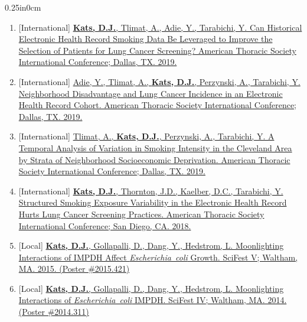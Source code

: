 \documentclass[11pt]{article}
\newcommand{\blockindent}{0.25in}
\begin{document}
\begin{adjustwidth}{\blockindent}{0cm}
\begin{enumerate}[resume]
		\item\label{ats19poster}[International] \href{https://www.dankats.com/research/ATS2019Poster.pdf}{\textbf{Kats, D.J.}, Tlimat, A., Adie, Y., Tarabichi, Y. Can Historical Electronic Health Record Smoking Data Be Leveraged to Improve the Selection of Patients for Lung Cancer Screening? American Thoracic Society International Conference; Dallas, TX. 2019.}

		\item\label{ats19adie}[International] \href{https://doi.org/10.1164/ajrccm-conference.2019.199.1_MeetingAbstracts.A7287}{Adie, Y., Tlimat, A., \textbf{Kats, D.J.}, Perzynski, A., Tarabichi, Y. Neighborhood Disadvantage and Lung Cancer Incidence in an Electronic Health Record Cohort. American Thoracic Society International Conference; Dallas, TX. 2019.}

		\item\label{ats19tlimat}[International] \href{https://doi.org/10.1164/ajrccm-conference.2019.199.1_MeetingAbstracts.A6712}{Tlimat, A., \textbf{Kats, D.J.}, Perzynski, A., Tarabichi, Y. A Temporal Analysis of Variation in Smoking Intensity in the Cleveland Area by Strata of Neighborhood Socioeconomic Deprivation. American Thoracic Society International Conference; Dallas, TX. 2019.}

		\item\label{ats18}[International] \href{http://www.dankats.com/research/ATS2018.pdf}{\textbf{Kats, D.J.}, Thornton, J.D., Kaelber, D.C., Tarabichi, Y. Structured Smoking Exposure Variability in the Electronic Health Record Hurts Lung Cancer Screening Practices. American Thoracic Society International Conference; San Diego, CA. 2018.}

		\item\label{scifest15}[Local] \href{https://kb.brandeis.edu/display/SCI/SciFest+V+Abstracts?preview=/16613394/16613408/scifest-2015-abstracts.pdf}{\textbf{Kats, D.J.}, Gollapalli, D., Dang, Y., Hedstrom, L. Moonlighting Interactions of IMPDH Affect \textit{Escherichia~coli} Growth. SciFest V; Waltham, MA. 2015. (Poster \#2015.421)}

		\item\label{scifest14}[Local] \href{https://kb.brandeis.edu/download/attachments/7996171/scifest-2014.pdf?version=1&modificationDate=1423410173000&api=v2}{\textbf{Kats, D.J.}, Gollapalli, D., Dang, Y., Hedstrom, L. Moonlighting Interactions of \textit{Escherichia~coli} IMPDH. SciFest IV; Waltham, MA. 2014. (Poster \#2014.311)}
	
	\end{enumerate}


\end{adjustwidth}
\end{document}
